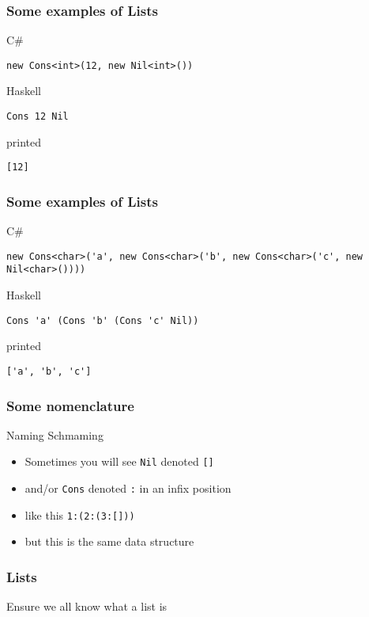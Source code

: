 \begin{frame}[fragile]
\frametitle{Some examples of Lists}
\begin{block}{C\#}
\begin{lstlisting}[style=csharp,basicstyle=\scriptsize\ttfamily,mathescape]
new Cons<int>(12, new Nil<int>())
\end{lstlisting}
\end{block}
\begin{block}{Haskell}
\begin{lstlisting}[style=haskell,basicstyle=\scriptsize\ttfamily,mathescape]
Cons 12 Nil
\end{lstlisting}
\end{block}
\begin{block}{printed}
\begin{lstlisting}[style=haskell,basicstyle=\scriptsize\ttfamily,mathescape]
[12]
\end{lstlisting}
\end{block}
\end{frame}

\begin{frame}[fragile]
\frametitle{Some examples of Lists}
\begin{block}{C\#}
\begin{lstlisting}[style=csharp,basicstyle=\tiny\ttfamily,mathescape]
new Cons<char>('a', new Cons<char>('b', new Cons<char>('c', new Nil<char>())))
\end{lstlisting}
\end{block}
\begin{block}{Haskell}
\begin{lstlisting}[style=haskell,basicstyle=\scriptsize\ttfamily,mathescape]
Cons 'a' (Cons 'b' (Cons 'c' Nil))
\end{lstlisting}
\end{block}
\begin{block}{printed}
\begin{lstlisting}[style=haskell,basicstyle=\scriptsize\ttfamily,mathescape]
['a', 'b', 'c']
\end{lstlisting}
\end{block}
\end{frame}

\begin{frame}
\frametitle{Some nomenclature}
\begin{block}{Naming Schmaming}
\begin{itemize}
\item<1-> Sometimes you will see \lstinline{Nil} denoted \lstinline{[]}
\item<2-> and/or \lstinline{Cons} denoted \lstinline{:} in an infix position
\item<3-> like this \lstinline{1:(2:(3:[]))}
\item<4-> but this is the same data structure
\end{itemize}
\end{block}
\end{frame}

\begin{frame}
\frametitle{Lists}
\begin{center}
Ensure we all know what a list is
\end{center}
\end{frame}
